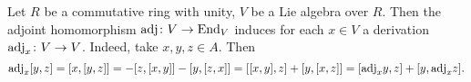 \begin{example}
  Let $R$ be a commutative ring with unity,
  $V$ be a Lie algebra over $R$.
  Then the adjoint homomorphism ${\rm adj} \colon V \to {\rm End}_V$ induces for
  each $x \in V$ a derivation ${\rm adj}_x \colon V \to V$.
  Indeed, take $x, y, z \in A$.
  Then
  \begin{equation}
    {\rm adj}_x [y, z]
    = [x, [y, z]]
    = - [z, [x, y]] - [y, [z, x]]
    = [[x, y], z] + [y, [x, z]]
    = [{\rm adj}_x y, z] + [y, {\rm adj}_x z].
  \end{equation}
\end{example}
